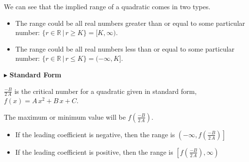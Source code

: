 \documentclass{ximera}
\begin{document}
We can see that the implied range of a quadratic comes in two types.  

\begin{itemize}
\item The range could be all real numbers greater than or equal to some particular number:  $\{ r \in \mathbb{R} \, | \, r \geq K \} = [K, \infty)$.
\item The range could be all real numbers less than or equal to some particular number:  $\{ r \in \mathbb{R} \, | \, r \leq K \} = (-\infty, K]$.
\end{itemize}






$\blacktriangleright$  \textbf{Standard Form} 

$\frac{-B}{2 \, A}$ is the critical number for a quadratic given in standard form, $f(x) = A \, x^2 + B \, x + C$. 

The maximum or minimum value will be $f\left( \frac{-B}{2 \, A} \right)$.



\begin{itemize}
     \item If the leading coefficient is negative, then the range is $\left(-\infty, f\left( \frac{-B}{2 \, A} \right)\right]$ \\
     \item If the leading coefficient is positive, then the range is $\left[f\left( \frac{-B}{2 \, A} \right), \infty \right)$ \\
\end{itemize}
\end{document}
